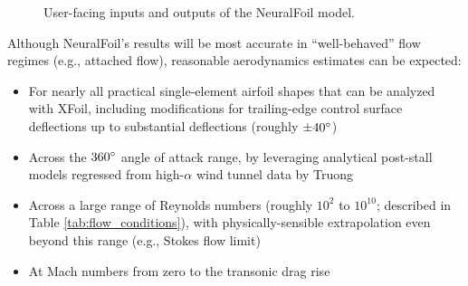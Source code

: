 \documentclass[journal]{new-aiaa}
\begin{document}
\begin{figure}[H]
    \caption{User-facing inputs and outputs of the NeuralFoil model.}
    \label{fig:neuralfoil_io}
\end{figure}

\noindent Although NeuralFoil's results will be most accurate in ``well-behaved'' flow regimes (e.g., attached flow), reasonable aerodynamics estimates can be expected:
\begin{itemize}
    \item For nearly all practical single-element airfoil shapes that can be analyzed with XFoil, including modifications for trailing-edge control surface deflections up to substantial deflections (roughly $\pm 40\degree$)
    \item Across the $360\degree$ angle of attack range, by leveraging analytical post-stall models regressed from high-$\alpha$ wind tunnel data by Truong \cite{truongAnalyticalModelAirfoil2020}
    \item Across a large range of Reynolds numbers (roughly $10^2$ to $10^{10}$; described in Table \ref{tab:flow_conditions}), with physically-sensible extrapolation even beyond this range (e.g., Stokes flow limit)
    \item At Mach numbers from zero to the transonic drag rise
\end{itemize}
\end{document}

